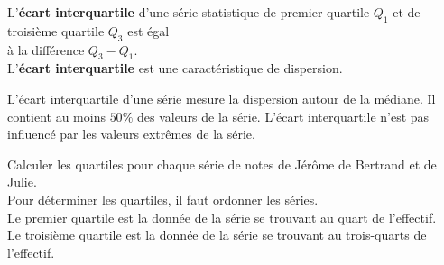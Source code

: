 \begin{Définition}
L'{\bf{écart interquartile}} d'une série statistique de premier quartile $Q_1$ et de troisième quartile $Q_3$ est égal \\ à la différence $Q_3 - Q_1$. \\
L'{\bf{écart interquartile}} est une caractéristique de dispersion.


\end{Définition}
\vspace{0.3cm}
\begin{Remarque}
L'écart interquartile d'une série mesure la dispersion autour de la médiane. Il contient au moins $50\%$ des valeurs de la série.
L'écart interquartile n'est pas influencé par les valeurs extrêmes de la série.
\end{Remarque}
\vspace{0.3cm}
\begin{Méthode}
Calculer les quartiles pour chaque série de notes de Jérôme de Bertrand et de Julie.\\
Pour déterminer les quartiles, il faut ordonner les séries.\\
Le premier quartile est la donnée de la série se trouvant au quart de l'effectif.\\
Le troisième quartile est la donnée de la série se trouvant au trois-quarts de l'effectif.
\vspace{0.3cm}

\ligne

\ligne

\ligne

\ligne

\ligne

\ligne

\ligne

\ligne

\ligne

\ligne

\ligne

\ligne

\ligne

\ligne

\ligne

\ligne

\ligne

\ligne

\ligne

\ligne

\ligne

\ligne

\ligne


\end{Méthode}


